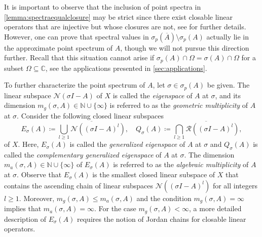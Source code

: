 \documentclass[english]{myarticle}
\begin{document}
\begin{sloppypar}
It is important to observe that the inclusion of point spectra in \cref{lemma:spectraequalclosure} may be strict since there exist closable linear operators that are injective but whose closures are not, see \cite[Section 19.2.5]{Mortad2022} for further details. However, one can prove that spectral values in $\sigma_p(\overline{A}) \setminus \sigma_p(A)$ actually lie in the approximate point spectrum of $A$, though we will not pursue this direction further. Recall that this situation cannot arise if $\sigma_p(A) \cap \Omega = \sigma(A) \cap \Omega$ for a subset $\Omega \subseteq \mathbb{C}$, see the applications presented in \cref{sec:applications}.


To further characterize the point spectrum of $A$, let $\sigma \in \sigma_p(A)$ be given. The linear subspace $\mathcal{N}(\sigma I - A)$ of $X$ is called the \emph{eigenspace} of $A$ at $\sigma$, and its dimension $m_g(\sigma, A) \in \mathbb{N} \cup \{\infty\}$ is referred to as the \emph{geometric multiplicity} of $A$ at $\sigma$. Consider the following closed linear subspaces
\begin{equation*}
    E_\sigma(A) \coloneqq \overline{\bigcup_{l \geq 1} \mathcal{N}((\sigma I - A)^l)}, \quad Q_\sigma(A) \coloneqq \overline{\bigcap_{l \geq 1} \mathcal{R}((\sigma I - A)^l)},
\end{equation*}
of $X$. Here, $E_\sigma(A)$ is called the \emph{generalized eigenspace} of $A$ at $\sigma$ and $Q_\sigma(A)$ is called the \emph{complementary generalized eigenspace} of $A$ at $\sigma$. The dimension $m_a(\sigma,A) \in \mathbb{N} \cup \{ \infty \}$ of $E_\sigma(A)$ is referred to as the \emph{algebraic multiplicity} of $A$ at $\sigma$. Observe that $E_\sigma(A)$ is the smallest closed linear subspace of $X$ that contains the ascending chain of linear subspaces $\mathcal{N}((\sigma I - A)^l)$ for all integers $l \geq 1$. Moreover, $m_g(\sigma,A) \leq m_a(\sigma,A)$ and the condition $m_g(\sigma,A)=\infty$ implies that $m_a(\sigma,A)=\infty$. For the case $m_g(\sigma,A) < \infty$, a more detailed description of $E_\sigma(A)$ requires the notion of Jordan chains for closable linear operators.


\end{sloppypar}
\end{document}
